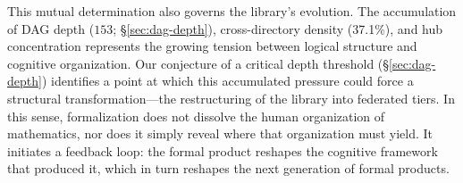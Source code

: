 This mutual determination also governs the library's evolution. The accumulation of DAG depth ($153$; \S\ref{sec:dag-depth}), cross-directory density (37.1\%), and hub concentration represents the growing tension between logical structure and cognitive organization. Our conjecture of a critical depth threshold (\S\ref{sec:dag-depth}) identifies a point at which this accumulated pressure could force a structural transformation---the restructuring of the library into federated tiers. In this sense, formalization does not dissolve the human organization of mathematics, nor does it simply reveal where that organization must yield. It initiates a feedback loop: the formal product reshapes the cognitive framework that produced it, which in turn reshapes the next generation of formal products.